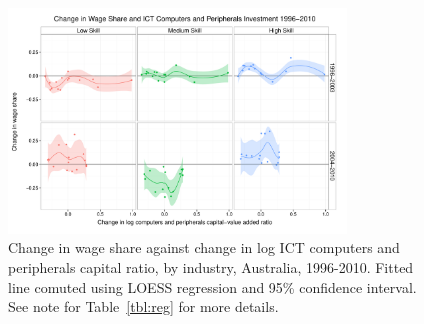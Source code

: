 \documentclass[a4paper]{article}
\begin{document}
\begin{figure}
  \centering
  \includegraphics[width=0.8\textwidth]{../figure/wage_share_peripherals_skill_split.pdf}
  \caption{Change in wage share against change in log ICT computers and peripherals capital ratio, by industry, Australia, 1996-2010. Fitted line comuted using LOESS regression and 95\% confidence interval.
    See note for Table~\ref{tbl:reg} for more details.
  }
  \label{fig:periph}
\end{figure}
\end{document}
